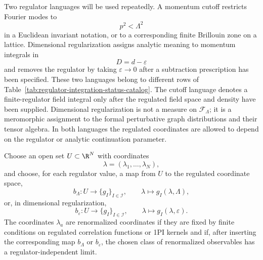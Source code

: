 Two regulator languages will be used repeatedly.  A momentum cutoff restricts
Fourier modes to
\[
  p^2<\Lambda^2
\]
in a Euclidean invariant notation, or to a corresponding finite Brillouin zone
on a lattice.  Dimensional regularization assigns analytic meaning to
momentum integrals in
\[
  D=d-\varepsilon
\]
and removes the regulator by taking \(\varepsilon\to0\) after a subtraction
prescription has been specified.  These two languages belong to different
rows of Table~\ref{tab:regulator-integration-status-catalog}.  The cutoff
language denotes a finite-regulator field integral only after the regulated
field space and density have been supplied.  Dimensional regularization is
not a measure on \(\mathcal F_\Lambda\); it is a meromorphic assignment to the
formal perturbative graph distributions and their tensor algebra.  In both
languages the regulated coordinates are allowed to depend on the regulator or
analytic continuation parameter.

\begin{definition}
\label{def:finite-parameter-renormalized-family}
Choose an open set \(U\subset\R^N\) with coordinates
\[
  \lambda=(\lambda_1,\ldots,\lambda_N),
\]
and choose, for each regulator value, a map from \(U\) to the regulated
coordinate space,
\[
  b_{\Lambda}\colon U\longrightarrow \{g_I\}_{I\in\mathcal I},
  \qquad
  \lambda\longmapsto g_I(\lambda,\Lambda),
 \]
or, in dimensional regularization,
\[
  b_{\varepsilon}\colon U\longrightarrow \{g_I\}_{I\in\mathcal I},
  \qquad
  \lambda\longmapsto g_I(\lambda,\varepsilon).
\]
The coordinates \(\lambda_a\) are renormalized coordinates if they are fixed by
finite conditions on regulated correlation functions or 1PI kernels and if,
after inserting the corresponding map \(b_\Lambda\) or \(b_\varepsilon\), the
chosen class of renormalized observables has a regulator-independent limit.
\end{definition}

